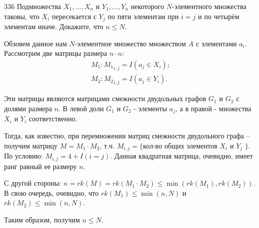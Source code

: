\begin{task}{336}
Подмножества $X_1, \dots , X_n$ и $Y_1, \dots, Y_n$ некоторого $N$-элементного множества таковы, что $X_i$ пересекается с $Y_j$ по пяти элементам при $i = j$ и по четырём элементам иначе. Докажите, что $n \leq N$.
\end{task}

\begin{solution}
Обзовем данное нам $N$-элементное множество множеством $A$ с элементами $a_i$. Рассмотрим две матрицы размера $n \cdot n$:
\begin{gather*}
    M_1 : {M_1}_{i,j} = I(a_j \in X_i); \\
    M_2 : {M_2}_{i,j} = I(a_j \in Y_i).
\end{gather*}\par
Эти матрицы являются матрицами смежности двудольных графов $G_1$ и $G_2$ с долями размера $n$. В левой доли $G_1$ и $G_2$ - элементы $a_ j$, а в правой - множества $X_i$ и $Y_i$ соответственно.\par
Тогда, как известно, при перемножении матриц смежности двудольного графа – получим матрицу $M = M_1 \cdot M_2$, т.ч. ${M}_{i,j} = \{$кол-во общих элементов $X_i$ и $Y_j$ $\}$. По условию: $M_{i,j} = 4 + I(i = j)$. Данная квадратная матрица, очевидно, имеет ранг равный ее размеру $n$.\par
С другой стороны: $n = rk(M) = rk(M_1 \cdot M_2) \leq \min(rk(M_1), rk(M_2))$.
В свою очередь, очевидно, что $rk(M_1) \leq \min(n, N)$ и $rk(M_2) \leq \min(n, N)$.\par
Таким образом, получим $n \leq N$.

\end{solution}